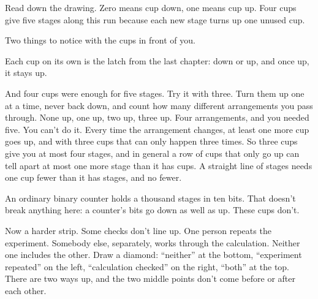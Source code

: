 \documentclass[11pt,twoside]{article}
\theoremstyle{thielethm}
\theoremstyle{thieledef}
\theoremstyle{thieledef}
\theoremstyle{thieledef}
\theoremstyle{thielethm}
\theoremstyle{thieleobs}
\theoremstyle{thielethm}
\begin{document}
\begin{center}

\small Read down the drawing. Zero means cup down, one means cup up. Four cups give five stages
along this run because each new stage turns up one unused cup.
\end{center}

Two things to notice with the cups in front of you.

Each cup on its own is the latch from the last chapter: down or up, and once up, it stays up.

And four cups were enough for five stages. Try it with three. Turn them up one at a time, never back down, and count how many different arrangements you pass through. None up, one up, two up, three up. Four arrangements, and you needed five. You can't do it. Every time the arrangement changes, at least one more cup goes up, and with three cups that can only happen three times. So three cups give you at most four stages, and in general a row of cups that only go up can tell apart at most one more stage than it has cups. A straight line of stages needs one cup fewer than it has stages, and no fewer.

An ordinary binary counter holds a thousand stages in ten bits. That doesn't break anything here: a counter's bits go down as well as up. These cups don't.

Now a harder strip. Some checks don't line up. One person repeats the experiment. Somebody else, separately, works through the calculation. Neither one includes the other. Draw a diamond: ``neither'' at the bottom, ``experiment repeated'' on the left, ``calculation checked'' on the right, ``both'' at the top. There are two ways up, and the two middle points don't come before or after each other.
\end{document}
